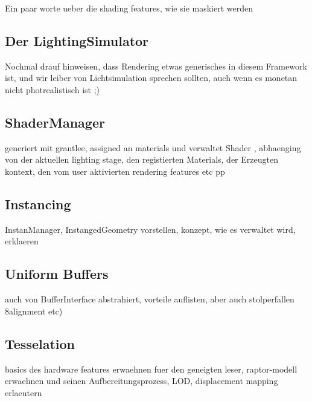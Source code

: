 
	Ein paar worte ueber die shading features, wie sie maskiert werden

\subsection{Der LightingSimulator}
	Nochmal drauf hinweisen, dass Rendering etwas generisches in diesem Framework ist, und wir leiber von Lichtsimulation sprechen sollten, auch wenn es monetan nicht photrealistisch ist ;)
	

\subsection{ShaderManager}
	generiert mit grantlee, assigned an materials und verwaltet Shader , abhaenging von der aktuellen lighting stage, den registierten Materials,
	der Erzeugten kontext, den vom user aktivierten rendering features etc pp
	
\subsection{Instancing}
	InstanManager, InstangedGeometry vorstellen, konzept, wie es verwaltet wird, erklaeren
\subsection{Uniform Buffers}
	auch von BufferInterface abstrahiert, vorteile auflisten, aber auch stolperfallen 8alignment etc)
\subsection{Tesselation}
	basics des hardware features erwaehnen fuer den geneigten leser, raptor-modell erwaehnen und seinen Aufbereitungsprozess, LOD, displacement mapping erlaeutern
	
	  

\clearpage